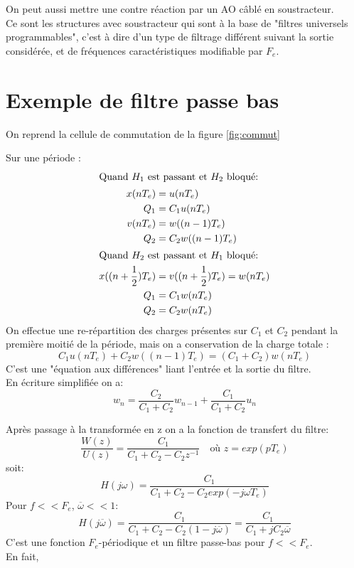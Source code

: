 \documentclass[main.tex]{subfiles}
\begin{document}
 On peut aussi mettre une contre réaction par un AO câblé en soustracteur.\\

Ce sont les structures avec soustracteur qui sont à la base de "filtres universels programmables", c'est à dire d'un type de filtrage différent suivant la sortie considérée, et de fréquences caractéristiques modifiable par $F_e$.\\

\section{Exemple de filtre passe bas}

On reprend la cellule de commutation de la figure \ref{fig:commut}

Sur une période :
\begin{align*}
\intertext{Quand $H_1$ est passant et $H_2$ bloqué:	}
x(nT_e) &= u(nT_e)\\
Q_1 &= C_1 u(nT_e)\\
v(nT_e) &= w((n-1)T_e)\\
Q_2 &= C_2 w((n-1)T_e)\\
\intertext{Quand $H_2$ est passant et $H_1$ bloqué:	}
x((n+\frac{1}{2})T_e) &= v((n+\frac{1}{2})T_e) = w(nT_e)\\
Q_1 &= C_1 w(nT_e)\\
Q_2 &= C_2 w(nT_e)
\end{align*}
On effectue une re-répartition des charges présentes sur $C_1$ et $C_2$ pendant la première moitié de la période, mais on a conservation de la charge totale :
\[C_1u(nT_e) + C_2w((n-1)T_e) = (C_1 + C_2)w(nT_e)\]
C'est une "équation aux différences" liant l'entrée et la sortie du filtre.\\

En écriture simplifiée on a:
\[w_n = \frac{C_2}{C_1 + C_2}w_{n-1} + \frac{C_1}{C_1 + C_2}u_n\]

Après passage à la transformée en z on a la fonction de transfert du filtre:
\[\frac{W(z)}{U(z)} = \frac{C_1}{C_1+C_2-C_2z^{-1}} \quad \text{où } z= exp(pT_e)\]
soit:
\[H(j\omega) = \frac{C_1}{C_1+C_2-C_2exp(-j\omega T_e)}\]
Pour $f<<F_e$, $\overline{\omega} << 1$:
 \[H(j\overline{\omega}) = \frac{C_1}{C_1+C_2-C_2(1-j\overline{\omega})} = \frac{C_1}{C_1+jC_2\overline{\omega}}\]
C'est une fonction $F_e$-périodique et un filtre passe-bas pour $f<<F_e$.\\

En fait,
\end{document}
